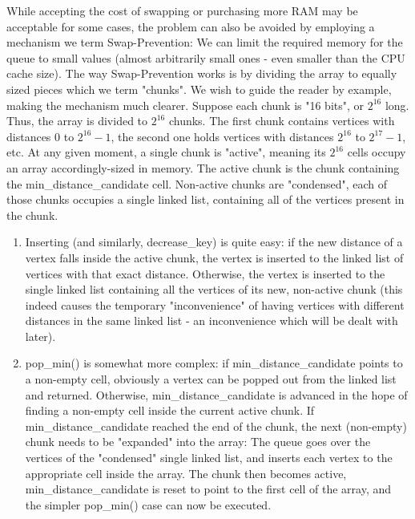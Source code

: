 \documentclass[conference,10pt,twocolumn]{IEEEtran}
\begin{document}
While accepting the cost of swapping or purchasing more RAM may be acceptable for some cases, the problem can also be avoided by employing a mechanism we term Swap-Prevention: We can limit the required memory for the queue to small values (almost arbitrarily small ones - even smaller than the CPU cache size). The way Swap-Prevention works is by dividing the array to equally sized pieces which we term "chunks". We wish to guide the reader by example, making the mechanism much clearer. Suppose each chunk is "16 bits", or $2^{16}$ long. Thus, the array is divided to $2^{16}$ chunks. The first chunk contains vertices with distances 0 to $2^{16} - 1$, the second one holds vertices with distances $2^{16}$ to $2^{17} - 1$, etc.
At any given moment, a single chunk is "active", meaning its $2^{16}$ cells occupy an array accordingly-sized in memory. The active chunk is the chunk containing the min\_distance\_candidate cell. Non-active chunks are "condensed", each of those chunks occupies a single linked list, containing all of the vertices present in the chunk. 

\begin{enumerate}

\item Inserting (and similarly, decrease\_key) is quite easy: if the new distance of a vertex falls inside the active chunk, the vertex is inserted to the linked list of vertices with that exact distance. Otherwise, the vertex is inserted to the single linked list containing all the vertices of its new, non-active chunk (this indeed causes the temporary "inconvenience" of having vertices with different distances in the same linked list - an inconvenience which will be dealt with later).

\item pop\_min() is somewhat more complex: if min\_distance\_candidate points to a non-empty cell, obviously a vertex can be popped out from the linked list and returned. Otherwise, min\_distance\_candidate is advanced in the hope of finding a non-empty cell inside the current active chunk. If min\_distance\_candidate reached the end of the chunk, the next (non-empty) chunk needs to be "expanded" into the array: The queue goes over the vertices of the "condensed" single linked list, and inserts each vertex to the appropriate cell inside the array. The chunk then becomes active, min\_distance\_candidate is reset to point to the first cell of the array, and the simpler pop\_min() case can now be executed.

\end{enumerate}
\end{document}
